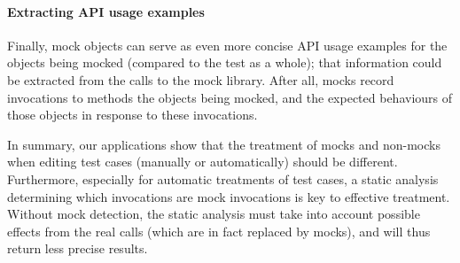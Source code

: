 \paragraph{Extracting API usage examples}
Finally, mock objects can serve as even more concise API usage
examples for the objects being mocked (compared to the test as a whole);
that information could be extracted from the calls to
the mock library. After all, mocks record invocations to methods the objects
being mocked, and the expected behaviours of those objects in response to
these invocations.

In summary, our applications show that the treatment of mocks and non-mocks
when editing test cases (manually or automatically) should be different.
Furthermore, especially for automatic treatments of test cases, a static
analysis determining which invocations are mock invocations is key to effective
treatment. Without mock detection, the static analysis must take into
account possible effects from the real calls (which are in fact replaced by mocks),
and will thus return less precise results.

